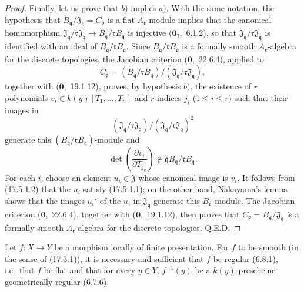 \begin{proof}
Finally, let us prove that $b)$ implies $a)$.
With the same notation, the hypothesis that $B_\mathfrak{q}/\mathfrak{J}_\mathfrak{q}=C_\mathfrak{p}$ is a flat $A_\mathfrak{r}$-module implies that the canonical homomorphism $\mathfrak{J}_\mathfrak{q}/\mathfrak{r}\mathfrak{J}_\mathfrak{q}\to B_\mathfrak{q}/\mathfrak{r}B_\mathfrak{q}$ is injective ($\mathbf{0}_\mathbf{I}$,~6.1.2), so that $\mathfrak{J}_\mathfrak{q}/\mathfrak{r}\mathfrak{J}_\mathfrak{q}$ is identified with an ideal of $B_\mathfrak{q}/\mathfrak{r}B_\mathfrak{q}$.
Since $B_\mathfrak{q}/\mathfrak{r}B_\mathfrak{q}$ is a formally smooth $A_\mathfrak{r}$-algebra for the discrete topologies, the Jacobian criterion ($\mathbf{0}$,~22.6.4), applied to
\[
C_\mathfrak{p}=(B_\mathfrak{q}/\mathfrak{r}B_\mathfrak{q})/(\mathfrak{J}_\mathfrak{q}/\mathfrak{r}\mathfrak{J}_\mathfrak{q}),
\]
together with ($\mathbf{0}$,~19.1.12), proves, by hypothesis $b)$, the existence of $r$ polynomials $v_i\in k(y)[T_1,\ldots,T_n]$ and $r$ indices $j_i$ ($1\leqslant i\leqslant r$) such that their images in
\[
(\mathfrak{J}_\mathfrak{q}/\mathfrak{r}\mathfrak{J}_\mathfrak{q})/(\mathfrak{J}_\mathfrak{q}/\mathfrak{r}\mathfrak{J}_\mathfrak{q})^2
\]
generate this $(B_\mathfrak{q}/\mathfrak{r}B_\mathfrak{q})$-module and
\[
\label{IV.17.5.1.2}
\tag{17.5.1.2}
\det\left(\frac{\partial v_i}{\partial T_{j_k}}\right)\notin\mathfrak{q}B_\mathfrak{q}/\mathfrak{r}B_\mathfrak{q}.
\]
For each $i$, choose an element $u_i\in\mathfrak{J}$ whose canonical image is $v_i$.
It follows from {\hyperlink{ega4.c04.eq.17-5-1-2}{(17.5.1.2)}} that the $u_i$ satisfy {\hyperlink{ega4.c04.eq.17-5-1-1}{(17.5.1.1)}}; on the other hand, Nakayama's lemma shows that the images $u_i'$ of the $u_i$ in $\mathfrak{J}_\mathfrak{q}$ generate this $B_\mathfrak{q}$-module.
The Jacobian criterion ($\mathbf{0}$,~22.6.4), together with ($\mathbf{0}$,~19.1.12), then proves that $C_\mathfrak{p}=B_\mathfrak{q}/\mathfrak{J}_\mathfrak{q}$ is a formally smooth $A_\mathfrak{r}$-algebra for the discrete topologies.
Q.E.D.
\end{proof}

\begin{corollary}[17.5.2]
\label{IV.17.5.2}
Let $f:X\to Y$ be a morphism locally of finite presentation.
For $f$ to be smooth (in the sense of {\hyperlink{ega4.c04.def.17-3-1}{(17.3.1)}}), it is necessary and sufficient that $f$ be regular {\hyperlink{ega4.c04.def.6-8-1}{(6.8.1)}}, i.e.\ that $f$ be flat and that for every $y\in Y$, $f^{-1}(y)$ be a $k(y)$-prescheme geometrically regular {\hyperlink{ega4.c04.def.6-7-6}{(6.7.6)}}.
\end{corollary}

